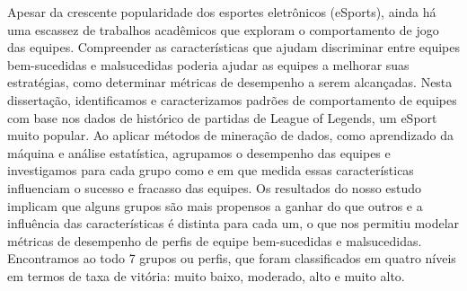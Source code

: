Apesar da crescente popularidade dos esportes eletrônicos (eSports), ainda há uma escassez de trabalhos acadêmicos que exploram o comportamento de jogo das equipes. Compreender as características que ajudam discriminar entre equipes bem-sucedidas e malsucedidas poderia ajudar as equipes a melhorar suas estratégias, como determinar métricas de desempenho a serem alcançadas. Nesta dissertação, identificamos e caracterizamos padrões de comportamento de equipes com base nos dados de histórico de partidas de League of Legends, um eSport muito popular. Ao aplicar métodos de mineração de dados, como aprendizado da máquina e análise estatística, agrupamos o desempenho das equipes e investigamos para cada grupo como e em que medida essas características influenciam o sucesso e fracasso das equipes. Os resultados do nosso estudo implicam que alguns grupos são mais propensos a ganhar do que outros e a influência das características é distinta para cada um, o que nos permitiu modelar métricas de desempenho de perfis de equipe bem-sucedidas e malsucedidas. Encontramos ao todo 7 grupos ou perfis, que foram classificados em quatro níveis em termos de taxa de vitória: muito baixo, moderado, alto e muito alto.
